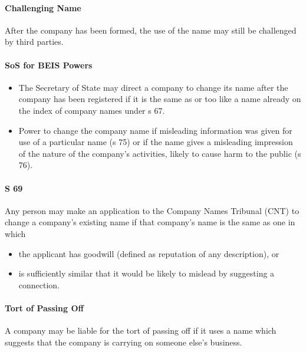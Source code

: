 \documentclass[
]{article}
\providecommand{\tightlist}{%
  \setlength{\itemsep}{0pt}\setlength{\parskip}{0pt}}
\begin{document}
\hypertarget{challenging-name}{%
\paragraph{Challenging Name}\label{challenging-name}}

After the company has been formed, the use of the name may still be
challenged by third parties.

\hypertarget{sos-for-beis-powers}{%
\paragraph{SoS for BEIS Powers}\label{sos-for-beis-powers}}

\begin{itemize}
\tightlist
\item
  The Secretary of State may direct a company to change its name after
  the company has been registered if it is the same as or too like a
  name already on the index of company names under s 67.
\item
  Power to change the company name if misleading information was given
  for use of a particular name (s 75) or if the name gives a misleading
  impression of the nature of the company's activities, likely to cause
  harm to the public (s 76).
\end{itemize}

\hypertarget{s-69}{%
\paragraph{S 69}\label{s-69}}

Any person may make an application to the Company Names Tribunal (CNT)
to change a company's existing name if that company's name is the same
as one in which

\begin{itemize}
\tightlist
\item
  the applicant has goodwill (defined as reputation of any description),
  or
\item
  is sufficiently similar that it would be likely to mislead by
  suggesting a connection.
\end{itemize}

\hypertarget{tort-of-passing-off}{%
\paragraph{Tort of Passing Off}\label{tort-of-passing-off}}

A company may be liable for the tort of passing off if it uses a name
which suggests that the company is carrying on someone else's business.
\end{document}
